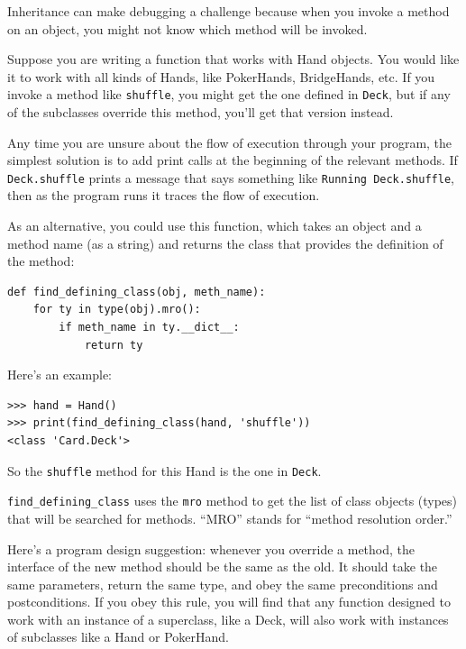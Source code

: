 \documentclass[10pt]{book}
\begin{document}
Inheritance can make debugging a challenge because when you
invoke a method on an object, you might not know which method
will be invoked.


Suppose you are writing a function that works with Hand objects.
You would like it to work with all kinds of Hands, like
PokerHands, BridgeHands, etc.  If you invoke a method like
{\tt shuffle}, you might get the one defined in {\tt Deck},
but if any of the subclasses override this method, you'll
get that version instead.  


Any time you are unsure about the flow of execution through your
program, the simplest solution is to add print calls at the
beginning of the relevant methods.  If {\tt Deck.shuffle} prints a
message that says something like {\tt Running Deck.shuffle}, then as
the program runs it traces the flow of execution.

As an alternative, you could use this function, which takes an
object and a method name (as a string) and returns the class that
provides the definition of the method:

\beforeverb
\begin{verbatim}
def find_defining_class(obj, meth_name):
    for ty in type(obj).mro():
        if meth_name in ty.__dict__:
            return ty
\end{verbatim}
\afterverb
%
Here's an example:

\beforeverb
\begin{verbatim}
>>> hand = Hand()
>>> print(find_defining_class(hand, 'shuffle'))
<class 'Card.Deck'>
\end{verbatim}
\afterverb
%
So the {\tt shuffle} method for this Hand is the one in {\tt Deck}.


\verb"find_defining_class" uses the {\tt mro} method to get the list
of class objects (types) that will be searched for methods.  ``MRO''
stands for ``method resolution order.''


Here's a program design suggestion: whenever you override a method,
the interface of the new method should be the same as the old.  It
should take the same parameters, return the same type, and obey the
same preconditions and postconditions.  If you obey this rule, you
will find that any function designed to work with an instance of a
superclass, like a Deck, will also work with instances of subclasses
like a Hand or PokerHand.
\end{document}
